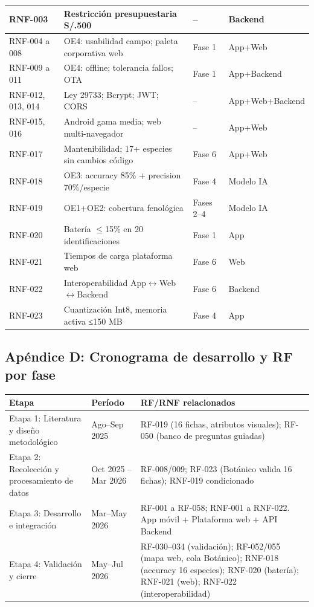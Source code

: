 \documentclass[12pt, a4paper]{article}
\begin{document}
\begin{longtable}{|p{3cm}|p{5.2cm}|p{2.8cm}|p{2.5cm}|}
\hline
RNF-003 & Restricci\'on presupuestaria S/.500 & -- & Backend \\
\hline
RNF-004 a 008 & OE4: usabilidad campo; paleta corporativa web & Fase 1 & App+Web \\
\hline
RNF-009 a 011 & OE4: offline; tolerancia fallos; OTA & Fase 1 & App+Backend \\
\hline
RNF-012, 013, 014 & Ley 29733; Bcrypt; JWT; CORS & -- & App+Web+Backend \\
\hline
RNF-015, 016 & Android gama media; web multi-navegador & -- & App+Web \\
\hline
RNF-017 & Mantenibilidad; 17+ especies sin cambios c\'odigo & Fase 6 & App+Web \\
\hline
RNF-018 & OE3: accuracy 85\% + precision 70\%/especie & Fase 4 & Modelo IA \\
\hline
RNF-019 & OE1+OE2: cobertura fenol\'ogica & Fases 2--4 & Modelo IA \\
\hline
RNF-020 & Bater\'ia $\leq$15\% en 20 identificaciones & Fase 1 & App \\
\hline
RNF-021 & Tiempos de carga plataforma web & Fase 6 & Web \\
\hline
RNF-022 & Interoperabilidad App$\leftrightarrow$Web$\leftrightarrow$Backend & Fase 6 & Backend \\
\hline
RNF-023 & Cuantización Int8, memoria activa ≤150 MB & Fase 4 & App \\
\hline
\end{longtable}

\subsection{Ap\'endice D: Cronograma de desarrollo y RF por fase}

\begin{longtable}{|p{3.2cm}|p{3.8cm}|p{6.8cm}|}
\hline
\textbf{Etapa} & \textbf{Per\'iodo} & \textbf{RF/RNF relacionados} \\
\hline
Etapa 1: Literatura y dise\~no metodol\'ogico & Ago--Sep 2025 & RF-019 (16 fichas, atributos visuales); RF-050 (banco de preguntas guiadas) \\
\hline
Etapa 2: Recolecci\'on y procesamiento de datos & Oct 2025 -- Mar 2026 & RF-008/009; RF-023 (Bot\'anico valida 16 fichas); RNF-019 condicionado \\
\hline
Etapa 3: Desarrollo e integraci\'on & Mar--May 2026 & RF-001 a RF-058; RNF-001 a RNF-022. App m\'ovil + Plataforma web + API Backend \\
\hline
Etapa 4: Validaci\'on y cierre & May--Jul 2026 & RF-030--034 (validaci\'on); RF-052/055 (mapa web, cola Bot\'anico); RNF-018 (accuracy 16 especies); RNF-020 (bater\'ia); RNF-021 (web); RNF-022 (interoperabilidad) \\
\hline
\end{longtable}
\end{document}

